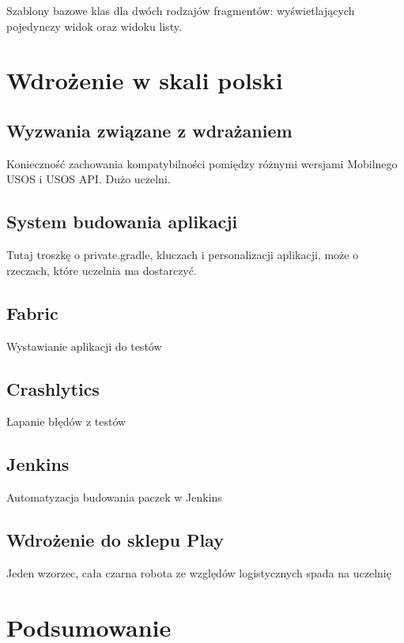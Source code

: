 \documentclass{pracamgr}
\begin{document}
Szablony bazowe klas dla dwóch rodzajów fragmentów:
wyświetlających pojedynczy widok oraz widoku listy.

\chapter{Wdrożenie w skali polski}

\section{Wyzwania związane z wdrażaniem}

Konieczność zachowania kompatybilności pomiędzy różnymi
wersjami Mobilnego USOS i USOS API. Dużo uczelni.

\section{System budowania aplikacji}

Tutaj troszkę o private.gradle, kluczach i personalizacji aplikacji,
może o rzeczach, które uczelnia ma dostarczyć.

\section{Fabric}

Wystawianie aplikacji do testów

\section{Crashlytics}

Łapanie błędów z testów

\section{Jenkins}

Automatyzacja budowania paczek w Jenkins

\section{Wdrożenie do sklepu Play}

Jeden wzorzec, cała czarna robota ze względów logistycznych spada na uczelnię

\chapter{Podsumowanie}
\end{document}
